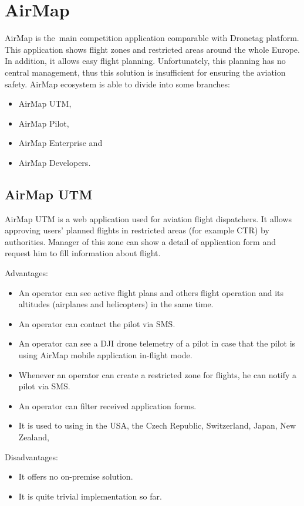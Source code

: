 \section{AirMap}\label{sec:airmap}
AirMap is the~main competition application comparable with Dronetag platform.\cite{airMap}
This application shows flight zones and restricted areas around the whole Europe.
In addition, it allows easy flight planning.
Unfortunately, this planning has no central management, thus this solution is insufficient for ensuring the aviation safety.
AirMap ecosystem is able to divide into some branches:
\begin{itemize}
    \item AirMap UTM,
    \item AirMap Pilot,
    \item AirMap Enterprise and
    \item AirMap Developers.
\end{itemize}

\subsection{AirMap UTM}\label{subsec:airmap-utm}
AirMap UTM is a web application used for aviation flight dispatchers.
It allows approving users' planned flights in restricted areas (for example CTR) by authorities.
Manager of this zone can show a detail of application form and request him to fill information about flight.

Advantages:
\begin{itemize}
    \item An operator can see active flight plans and others flight operation and its altitudes (airplanes and helicopters) in the same time.
    \item An operator can contact the pilot via SMS.
    \item An operator can see a DJI drone telemetry of a pilot in case that the pilot is using AirMap mobile application in-flight mode.
    \item Whenever an operator can create a restricted zone for flights, he can notify a pilot via SMS.
    \item An operator can filter received application forms.
    \item It is used to using in the USA, the Czech Republic, Switzerland, Japan, New Zealand, \textellipsis
\end{itemize}
Disadvantages:
\begin{itemize}
    \item It offers no on-premise solution.
    \item It is quite trivial implementation so far.
\end{itemize}


